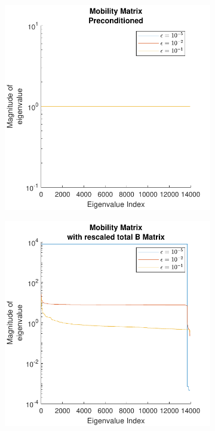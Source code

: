 \begin{figure}
\begin{subfigure}{0.45\textwidth}
    \end{subfigure}
    \begin{subfigure}{0.45\textwidth}
        \centering
        \includegraphics[width=\linewidth]{Images/Condition/Eigen-Mobility Matrix Preconditioned.pdf}
    \end{subfigure}
    \hfill
    \begin{subfigure}{0.45\textwidth}
        \centering
        \includegraphics[width=\linewidth]{Images/Condition/Eigen-Mobility Matrix with rescaled total B Matrix.pdf}

\end{subfigure}
\end{figure}
